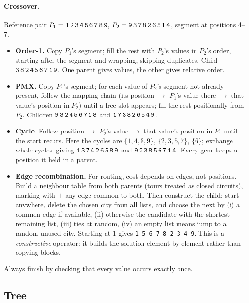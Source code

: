 \documentclass[11pt,a4paper]{article}
\begin{document}
\paragraph{Crossover.} Reference pair
$P_1=\texttt{1\,2\,3\,4\,5\,6\,7\,8\,9}$,
$P_2=\texttt{9\,3\,7\,8\,2\,6\,5\,1\,4}$, segment at positions 4--7.
\begin{itemize}[leftmargin=*]
  \item \textbf{Order-1.} Copy $P_1$'s segment; fill the rest with $P_2$'s
        values in $P_2$'s order, starting after the segment and wrapping,
        skipping duplicates. Child $\texttt{3\,8\,2\,4\,5\,6\,7\,1\,9}$. One
        parent gives values, the other gives relative order.
  \item \textbf{PMX.} Copy $P_1$'s segment; for each value of $P_2$'s segment
        not already present, follow the mapping chain (its position
        $\to$ $P_1$'s value there $\to$ that value's position in $P_2$) until
        a free slot appears; fill the rest positionally from $P_2$. Children
        $\texttt{9\,3\,2\,4\,5\,6\,7\,1\,8}$ and
        $\texttt{1\,7\,3\,8\,2\,6\,5\,4\,9}$.
  \item \textbf{Cycle.} Follow position $\to$ $P_2$'s value $\to$ that
        value's position in $P_1$ until the start recurs. Here the cycles are
        $\{1,4,8,9\}$, $\{2,3,5,7\}$, $\{6\}$; exchange whole cycles, giving
        $\texttt{1\,3\,7\,4\,2\,6\,5\,8\,9}$ and
        $\texttt{9\,2\,3\,8\,5\,6\,7\,1\,4}$. Every gene keeps a position it
        held in a parent.
  \item \textbf{Edge recombination.} For routing, cost depends on edges, not
        positions. Build a neighbour table from both parents (tours treated
        as closed circuits), marking with $+$ any edge common to both. Then
        construct the child: start anywhere, delete the chosen city from all
        lists, and choose the next by (i) a common edge if available, (ii)
        otherwise the candidate with the shortest remaining list, (iii) ties
        at random, (iv) an empty list means jump to a random unused city.
        Starting at 1 gives \texttt{1\,5\,6\,7\,8\,2\,3\,4\,9}. This is a
        \emph{constructive} operator: it builds the solution element by
        element rather than copying blocks.
\end{itemize}
Always finish by checking that every value occurs exactly once.

\subsection{Tree}
\end{document}
